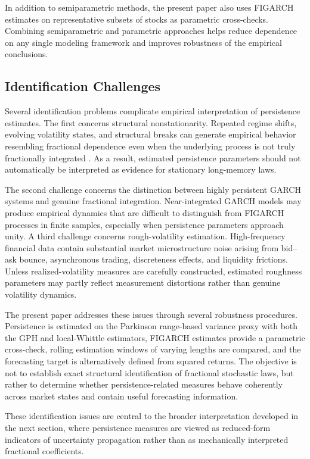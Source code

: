 \documentclass[jrfm,article,submit,moreauthors,pdftex]{Definitions/mdpi}
\begin{document}
In addition to semiparametric methods, the present paper also uses FIGARCH
estimates on representative subsets of stocks as parametric cross-checks.
Combining semiparametric and parametric approaches helps reduce dependence
on any single modeling framework and improves robustness of the empirical
conclusions.

\subsection{Identification Challenges}

Several identification problems complicate empirical interpretation of
persistence estimates. The first concerns structural nonstationarity.
Repeated regime shifts, evolving volatility states, and structural breaks
can generate empirical behavior resembling fractional dependence even when
the underlying process is not truly fractionally integrated
\citep{mikosch2004nonstationarities}. As a result, estimated persistence
parameters should not automatically be interpreted as evidence for
stationary long-memory laws.

The second challenge concerns the distinction between highly persistent
GARCH systems and genuine fractional integration. Near-integrated GARCH
models may produce empirical dynamics that are difficult to distinguish from
FIGARCH processes in finite samples, especially when persistence parameters
approach unity. A third challenge concerns rough-volatility estimation.
High-frequency financial data contain substantial market microstructure
noise arising from bid--ask bounce, asynchronous trading, discreteness
effects, and liquidity frictions. Unless realized-volatility measures are
carefully constructed, estimated roughness parameters may partly reflect
measurement distortions rather than genuine volatility dynamics.

The present paper addresses these issues through several robustness
procedures. Persistence is estimated on the Parkinson range-based variance
proxy with both the GPH and local-Whittle estimators, FIGARCH estimates
provide a parametric cross-check, rolling estimation windows of varying
lengths are compared, and the forecasting target is alternatively defined
from squared returns. The objective is not to establish exact
structural identification of fractional stochastic laws, but rather to
determine whether persistence-related measures behave coherently across
market states and contain useful forecasting information.

These identification issues are central to the broader interpretation
developed in the next section, where persistence measures are viewed as
reduced-form indicators of uncertainty propagation rather than as
mechanically interpreted fractional coefficients.
\end{document}
